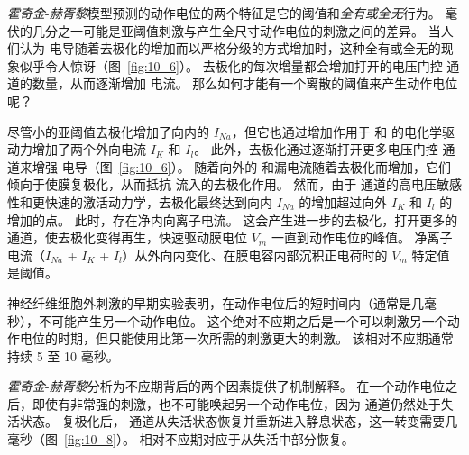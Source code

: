 \textit{霍奇金}-\textit{赫胥黎}模型预测的动作电位的两个特征是它的阈值和\textit{全有或全无}行为。
毫伏的几分之一可能是亚阈值刺激与产生全尺寸动作电位的刺激之间的差异。
当人们认为  电导随着去极化的增加而以严格分级的方式增加时，这种全有或全无的现象似乎令人惊讶（图~\ref{fig:10_6}）。 
去极化的每次增量都会增加打开的电压门控  通道的数量，从而逐渐增加  电流。
那么如何才能有一个离散的阈值来产生动作电位呢？


尽管小的亚阈值去极化增加了向内的 $I_{Na}$，但它也通过增加作用于  和  的电化学驱动力增加了两个外向电流 $I_K$ 和 $I_l$。
此外，去极化通过逐渐打开更多电压门控  通道来增强  电导（图~\ref{fig:10_6}）。
随着向外的  和漏电流随着去极化而增加，它们倾向于使膜复极化，从而抵抗  流入的去极化作用。
然而，由于  通道的高电压敏感性和更快速的激活动力学，去极化最终达到向内 $I_{Na}$ 的增加超过向外 $I_K$ 和 $I_l$ 的增加的点。
此时，存在净内向离子电流。
这会产生进一步的去极化，打开更多的  通道，使去极化变得再生，快速驱动膜电位 $V_m$ 一直到动作电位的峰值。
净离子电流（$I_{Na}$ + $I_K$ + $I_l$）从外向内变化、在膜电容内部沉积正电荷时的 $V_m$ 特定值是阈值。


神经纤维细胞外刺激的早期实验表明，在动作电位后的短时间内（通常是几毫秒），不可能产生另一个动作电位。 
这个绝对不应期之后是一个可以刺激另一个动作电位的时期，但只能使用比第一次所需的刺激更大的刺激。 
该相对不应期通常持续 5 至 10 毫秒。


\textit{霍奇金}-\textit{赫胥黎}分析为不应期背后的两个因素提供了机制解释。
在一个动作电位之后，即使有非常强的刺激，也不可能唤起另一个动作电位，因为  通道仍然处于失活状态。
复极化后， 通道从失活状态恢复并重新进入静息状态，这一转变需要几毫秒（图~\ref{fig:10_8}）。
相对不应期对应于从失活中部分恢复。


